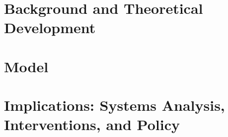 

\part{Background and Theoretical Development} \label{part-background}






\part{Model} \label{part-model}



\part{Implications: Systems Analysis, Interventions, and Policy} \label{part-system}





